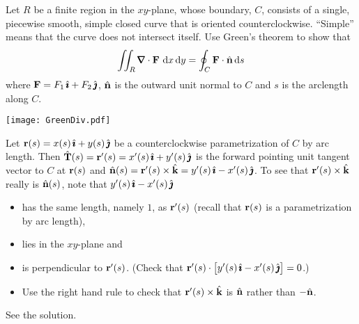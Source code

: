 \begin{question}
 Let $R$ be a finite region in the $xy$-plane,
whose boundary, $C$, consists of a single, piecewise smooth, simple
closed curve that is oriented counterclockwise.
``Simple'' means that the curve does not intersect itself.
Use Green's theorem to show that 
\begin{equation*}
\dblInt_R\vnabla\cdot\vF\ \dee{x}\,\dee{y}=\oint_C\vF\cdot\hn\,\dee{s}
\end{equation*}
where $\mathbf{F}=F_1\,\hat{\pmb{\imath}}+F_2\,\hat{\pmb{\jmath}}$, $\hat{\mathbf{n}}$ is the outward unit normal to $C$ and $s$ 
is the arclength along $C$.
\begin{center}
       \texttt{[image: GreenDiv.pdf]}
\end{center}

\end{question}

\begin{hint} 
Let $\mathbf{r}(s)=x(s)\,\hat{\pmb{\imath}}+y(s)\,\hat{\pmb{\jmath}}$ be a counterclockwise parametrization of 
$C$ by arc length. Then $\hat{\mathbf{T}}(s) = \mathbf{r}'(s) = x'(s)\,\hat{\pmb{\imath}}+y'(s)\,\hat{\pmb{\jmath}}$
is the forward pointing unit tangent vector to $C$ at $\mathbf{r}(s)$
and $\hat{\mathbf{n}}(s) = \mathbf{r}'(s)\times\hat{\mathbf{k}}=y'(s)\,\hat{\pmb{\imath}}-x'(s)\,\hat{\pmb{\jmath}}$. To see
that $\mathbf{r}'(s)\times\hat{\mathbf{k}}$ really is $\hat{\mathbf{n}}(s)$, note that 
$y'(s)\,\hat{\pmb{\imath}}-x'(s)\,\hat{\pmb{\jmath}}$ 
\begin{itemize}\itemsep1pt \parskip0pt 
\item
has the same length, namely $1$, as $\mathbf{r}'(s)$ (recall that $\mathbf{r}(s)$ is a
parametrization by arc length),
\item
lies in the $xy$-plane and 

\item
is perpendicular to $\mathbf{r}'(s)$. 
(Check that $\mathbf{r}'(s)\cdot\big[y'(s)\,\hat{\pmb{\imath}}-x'(s)\,\hat{\pmb{\jmath}}\big]=0$.) 
\item
Use the right hand rule to check that $\mathbf{r}'(s)\times\hat{\mathbf{k}}$ is 
$\hat{\mathbf{n}}$ rather than $-\hat{\mathbf{n}}$.
\end{itemize}
\end{hint}

\begin{answer} 
See the solution.
\end{answer}

